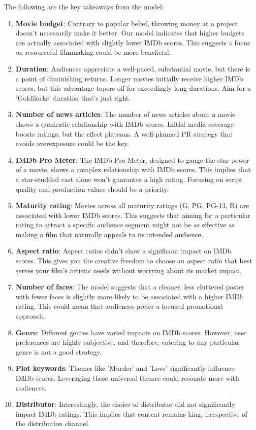 \documentclass[12pt,a4paper]{article}
\begin{document}
The following are the key takeaways from the model:
\begin{enumerate}
    \item \textbf{Movie budget}: Contrary to popular belief, throwing money at a project doesn't necessarily make it better. Our model indicates that higher budgets are actually associated with slightly lower IMDb scores. This suggests a focus on resourceful filmmaking could be more beneficial.
    \item \textbf{Duration}: Audiences appreciate a well-paced, substantial movie, but there is a point of diminishing returns. Longer movies initially receive higher IMDb scores, but this advantage tapers off for exceedingly long durations. Aim for a 'Goldilocks' duration that's just right.
    \item \textbf{Number of news articles}: The number of news articles about a movie shows a quadratic relationship with IMDb scores. Initial media coverage boosts ratings, but the effect plateaus. A well-planned PR strategy that avoids overexposure could be the key.
    \item \textbf{IMDb Pro Meter}: The IMDb Pro Meter, designed to gauge the star power of a movie, shows a complex relationship with IMDb scores. This implies that a star-studded cast alone won't guarantee a high rating. Focusing on script quality and production values should be a priority.
    \item \textbf{Maturity rating}: Movies across all maturity ratings (G, PG, PG-13, R) are associated with lower IMDb scores. This suggests that aiming for a particular rating to attract a specific audience segment might not be as effective as making a film that naturally appeals to its intended audience.
    \item \textbf{Aspect ratio}: Aspect ratios didn't show a significant impact on IMDb scores. This gives you the creative freedom to choose an aspect ratio that best serves your film's artistic needs without worrying about its market impact.
    \item \textbf{Number of faces}: The model suggests that a cleaner, less cluttered poster with fewer faces is slightly more likely to be associated with a higher IMDb rating. This could mean that audiences prefer a focused promotional approach.
    \item \textbf{Genre}: Different genres have varied impacts on IMDb scores. However, user preferences are highly subjective, and therefore, catering to any particular genre is not a good strategy.
    \item \textbf{Plot keywords}: Themes like 'Murder' and 'Love' significantly influence IMDb scores. Leveraging these universal themes could resonate more with audiences.
    \item \textbf{Distributor}: Interestingly, the choice of distributor did not significantly impact IMDb ratings. This implies that content remains king, irrespective of the distribution channel.
\end{enumerate}
\end{document}

